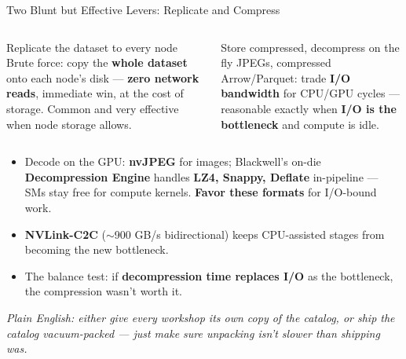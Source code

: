 \documentclass[aspectratio=169]{beamer}
\newcommand{\kw}[1]{\textbf{\textcolor{kwblue}{#1}}}
\newcommand{\pe}[1]{\par{\setlength{\fboxsep}{2.5pt}\noindent\colorbox{navy!9}{\parbox{\dimexpr\textwidth-5pt\relax}{\footnotesize\itshape Plain English: #1}}}}
\begin{document}
\begin{frame}{Two Blunt but Effective Levers: Replicate and Compress}
  \begin{columns}[t]
    \begin{block}{Replicate the dataset to every node}
      \small Brute force: copy the \kw{whole dataset} onto each node's disk ---
      \kw{zero network reads}, immediate win, at the cost of storage.
      Common and very effective when node storage allows.
    \end{block}
    \begin{block}{Store compressed, decompress on the fly}
      \small JPEGs, compressed Arrow/Parquet: trade \kw{I/O bandwidth} for CPU/GPU cycles ---
      reasonable exactly when \kw{I/O is the bottleneck} and compute is idle.
    \end{block}
  \end{columns}
  \medskip
  \begin{itemize}\small
    \item Decode on the GPU: \kw{nvJPEG} for images; Blackwell's on-die
          \kw{Decompression Engine} handles \kw{LZ4, Snappy, Deflate} in-pipeline ---
          SMs stay free for compute kernels. \kw{Favor these formats} for I/O-bound work.
    \item \kw{NVLink-C2C} ($\sim$900 GB/s bidirectional) keeps CPU-assisted stages from
          becoming the new bottleneck.
    \item The balance test: if \kw{decompression time replaces I/O} as the bottleneck,
          the compression wasn't worth it.
  \end{itemize}
  \pe{either give every workshop its own copy of the catalog, or ship the catalog vacuum-packed --- just make sure unpacking isn't slower than shipping was.}
\end{frame}
\end{document}
